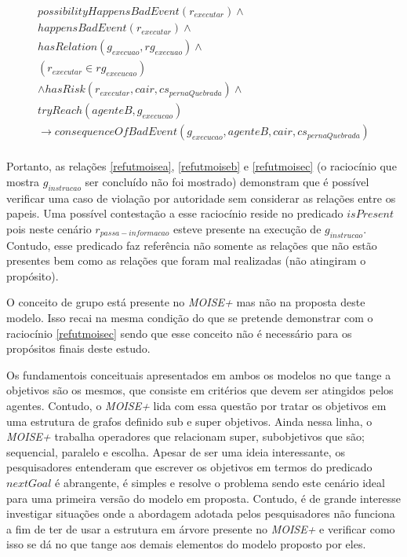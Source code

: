 \begin{eqnarray}\label{refutmoisec}
	possibilityHappensBadEvent(r_{executar}) \wedge  \nonumber \\ 
    happensBadEvent(r_{executar}) \wedge \nonumber \\ 
    hasRelation(g_{execuao},rg_{execuao}) \wedge \nonumber \\
    (r_{executar} \in rg_{execucao}) \nonumber \\ 
	\wedge hasRisk(r_{executar}, cair, cs_{pernaQuebrada}) \wedge \nonumber \\ 
    tryReach(agenteB,g_{execucao}) \nonumber \\ 
	\to consequenceOfBadEvent(g_{execucao},agenteB,cair,cs_{pernaQuebrada}) \nonumber \\ 
\end{eqnarray}

Portanto, as relações \ref{refutmoisea}, \ref{refutmoiseb} e \ref{refutmoisec} (o raciocínio que mostra $g_{instrucao}$ ser concluído não foi mostrado) 
demonstram que é possível verificar uma caso de violação por autoridade sem considerar as relações entre os papeis. Uma possível contestação a esse 
raciocínio reside no predicado $isPresent$ pois neste cenário $r_{passa-informacao}$ esteve presente na execução de $g_{instrucao}$. Contudo, esse predicado 
faz referência não somente as relações que não estão presentes bem como as relações que foram mal realizadas (não atingiram o propósito). 

O conceito de grupo está presente no \textit{MOISE+} mas não na proposta deste modelo. Isso recai na mesma condição do que se pretende demonstrar com o 
raciocínio \ref{refutmoisec} sendo que esse conceito não é necessário para os propósitos finais deste estudo. 

Os fundamentois conceituais apresentados em ambos os modelos no que tange a objetivos são os mesmos, que consiste em critérios que devem ser atingidos 
pelos agentes. Contudo, o \textit{MOISE+} lida com essa questão por tratar os objetivos em uma estrutura de grafos definido sub e super objetivos. Ainda 
nessa linha, o \textit{MOISE+} trabalha operadores que relacionam super, subobjetivos que são; sequencial, paralelo e escolha. Apesar de ser uma ideia 
interessante, os pesquisadores entenderam que escrever os objetivos em termos do predicado $nextGoal$ é abrangente, é simples e resolve o problema sendo este 
cenário ideal para uma primeira versão do modelo em proposta. Contudo, é de grande interesse investigar situações onde a abordagem adotada pelos pesquisadores 
não funciona a fim de ter de usar a estrutura em árvore presente no \textit{MOISE+} e verificar como isso se dá no que tange aos demais elementos do modelo 
proposto por eles.

